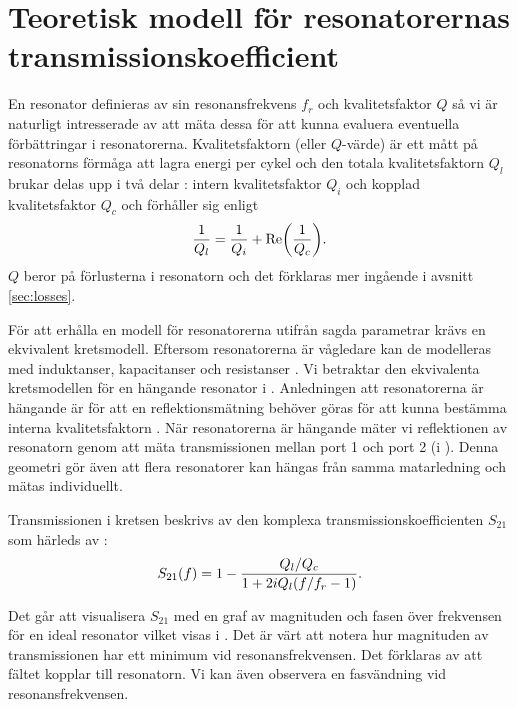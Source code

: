 \documentclass[main.tex]{subfiles}
\begin{document}
\newpage
\section{Teoretisk modell för resonatorernas transmissionskoefficient}
\label{sec:res_teori}


En resonator definieras av sin resonansfrekvens $f_r$ och kvalitetsfaktor $Q$ \cite[s. 3]{Boehme2016} så vi är naturligt intresserade av att mäta dessa för att kunna evaluera eventuella förbättringar i resonatorerna. Kvalitetsfaktorn (eller $Q$-värde) är ett mått på resonatorns förmåga att lagra energi per cykel och den totala kvalitetsfaktorn $Q_l$ brukar delas upp i två delar \cite{Probst2015}: intern kvalitetsfaktor $Q_i$ och kopplad kvalitetsfaktor $Q_c$ och förhåller sig enligt 
\begin{equation}
\frac{1}{Q_l}=\frac{1}{Q_i}+\text{Re}\qty(\frac{1}{Q_c}).
\end{equation}
$Q$ beror på förlusterna i resonatorn och det förklaras mer ingående i avsnitt \ref{sec:losses}.

För att erhålla en modell för resonatorerna utifrån sagda parametrar krävs en ekvivalent kretsmodell. Eftersom resonatorerna är vågledare kan de modelleras med induktanser, kapacitanser och resistanser \cite[s. 437]{cheng}. Vi betraktar den ekvivalenta kretsmodellen för en hängande resonator \cite{Boehme2016} i . Anledningen att resonatorerna är hängande är för att en reflektionsmätning behöver göras för att kunna bestämma interna kvalitetsfaktorn \cite{Probst2015}. När resonatorerna är hängande mäter vi reflektionen av resonatorn genom att mäta transmissionen mellan port 1 och port 2 (i ). Denna geometri gör även att flera resonatorer kan hängas från samma matarledning och mätas individuellt.

Transmissionen i kretsen beskrivs av den komplexa transmissionskoefficienten $S_{21}$ som härleds av \citeauthor{Boehme2016} \cite[s. 38]{Boehme2016}:
\begin{equation}
    S_{21}(f)=1-\frac{Q_l/Q_c}{1+2iQ_l\qty(f/f_r-1)}.
\label{eq:S21_ideal}
\end{equation}

Det går att visualisera $S_{21}$ med en graf av magnituden och fasen över frekvensen för en ideal resonator vilket visas i . Det är värt att notera hur magnituden av transmissionen har ett minimum vid resonansfrekvensen. Det förklaras av att fältet kopplar till resonatorn. Vi kan även observera en fasvändning vid resonansfrekvensen.
\end{document}
